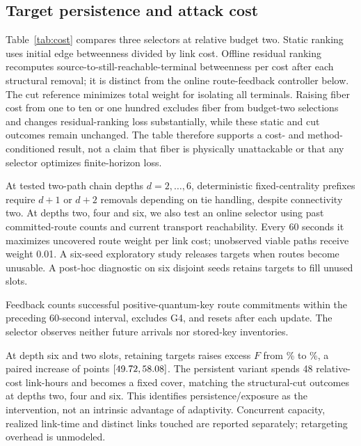 \documentclass[conference,a4paper]{IEEEtran}
\begin{document}
\subsection{Target persistence and attack cost}\label{sec:persistence}
Table~\ref{tab:cost} compares three selectors at relative budget two. Static ranking uses initial edge betweenness divided by link cost. Offline residual ranking recomputes source-to-still-reachable-terminal betweenness per cost after each structural removal; it is distinct from the online route-feedback controller below. The cut reference minimizes total weight for isolating all terminals. Raising fiber cost from one to ten or one hundred excludes fiber from budget-two selections and changes residual-ranking loss substantially, while these static and cut outcomes remain unchanged. The table therefore supports a cost- and method-conditioned result, not a claim that fiber is physically unattackable or that any selector optimizes finite-horizon loss.

\begin{table}[t]
\caption{Offered-entitlement loss $F$ (\%) at relative budget two. Free-space cost is one; means and 95\% seed intervals use eight formation runs per cell. Residual denotes the offline residual ranking.}
\label{tab:cost}
\centering\footnotesize
\setlength{\tabcolsep}{2.5pt}

\end{table}

At tested two-path chain depths $d=2,\ldots,6$, deterministic fixed-centrality prefixes require $d+1$ or $d+2$ removals depending on tie handling, despite connectivity two. At depths two, four and six, we also test an online selector using past committed-route counts and current transport reachability. Every 60 seconds it maximizes uncovered route weight per link cost; unobserved viable paths receive weight 0.01. A six-seed exploratory study releases targets when routes become unusable. A post-hoc diagnostic on six disjoint seeds retains targets to fill unused slots.

Feedback counts successful positive-quantum-key route commitments within the preceding 60-second interval, excludes G4, and resets after each update. The selector observes neither future arrivals nor stored-key inventories.

At depth six and two slots, retaining targets raises excess $F$ from \OnlineRelease\% to \OnlinePersistent\%, a paired increase of \OnlinePersistenceGain{} points $[49.72,58.08]$. The persistent variant spends 48 relative-cost link-hours and becomes a fixed cover, matching the structural-cut outcomes at depths two, four and six. This identifies persistence/exposure as the intervention, not an intrinsic advantage of adaptivity. Concurrent capacity, realized link-time and distinct links touched are reported separately; retargeting overhead is unmodeled.
\end{document}
